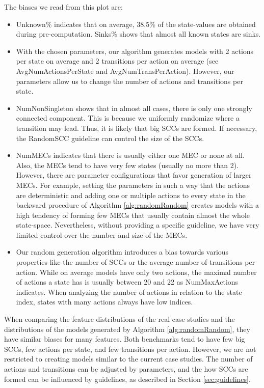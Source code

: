 The biases we read from this plot are:
\begin{itemize} \label{insights:randomRandom}
    \item Unknown\% indicates that on average, 38.5\% of the state-values are obtained during pre-computation. Sinks\% shows that almost all known states are sinks.
    \item With the chosen parameters, our algorithm generates models with 2 actions per state on average and 2 transitions per action on average (see AvgNumActionsPerState and AvgNumTransPerAction).     
     However, our parameters allow us to change the number of actions and transitions per state.
    \item NumNonSingleton shows that in almost all cases, there is only one strongly connected component.
        This is because we uniformly randomize where a transition may lead. Thus, it is likely that big SCCs are formed. 
        If necessary, the RandomSCC guideline can control the size of the SCCs.
    \item NumMECs indicates that there is usually either one MEC or none at all. Also, the MECs tend to have very few states (usually no more than 2).
    However, there are parameter configurations that favor generation of larger MECs. For example, setting the parameters in such a way that the actions are deterministic
    and adding one or multiple actions to every state in the backward procedure of Algorithm \ref{alg:randomRandom} creates models with a high tendency of forming few MECs that usually contain almost the whole state-space.
    Nevertheless, without providing a specific guideline, we have very limited control over the number and size of the MECs.
    \item Our random generation algorithm introduces a bias towards various properties like the number of SCCs or the average number of transitions per action.
    While on average models have only two actions, the maximal number of actions a state has is usually between 20 and 22 as NumMaxActions indicates.
    When analyzing the number of actions in relation to the state index, states with many actions always have low indices.
\end{itemize}

When comparing the feature distributions of the real case studies and the distributions of the models generated by Algorithm \ref{alg:randomRandom},
they have similar biases for many features. Both benchmarks tend to have few big SCCs, few actions per state, and few transitions per action.
However, we are not restricted to creating models similar to the current case studies. The number of actions and transitions can be adjusted by parameters,
and the how SCCs are formed can be influenced by guidelines, as described in Section \ref{sec:guidelines}.
\FloatBarrier


